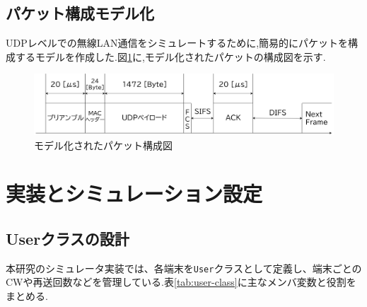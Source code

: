 \documentclass[a4paper, 10pt]{ltjsarticle}
\begin{document}
\subsection{パケット構成モデル化}

UDPレベルでの無線LAN通信をシミュレートするために,簡易的にパケットを構成するモデルを作成した.図\ref{packet}に,モデル化されたパケットの構成図を示す.

\begin{figure}[H]
  \centering
  \includegraphics[width=1\columnwidth]{./assets/packet.png}
  \caption{モデル化されたパケット構成図}
  \label{packet}
\end{figure}



\section{実装とシミュレーション設定}
\subsection{Userクラスの設計}
本研究のシミュレータ実装では、各端末を\texttt{User}クラスとして定義し、端末ごとのCWや再送回数などを管理している.表\ref{tab:user-class}に主なメンバ変数と役割をまとめる.
\end{document}

